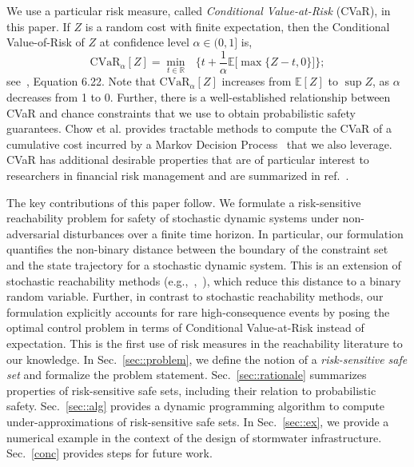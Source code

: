 \documentclass[letterpaper, 10 pt, conference]{ieeeconf}  %
\begin{document}
We use a particular risk measure, called \textit{Conditional Value-at-Risk} (CVaR), in this paper.
If $Z$ is a random cost with finite expectation, then the Conditional Value-of-Risk of $Z$ at confidence level $\alpha \in (0,1]$
is, 
\begin{equation}
\text{CVaR}_\alpha[Z] = {\underset{t \in \mathbb{R}}\min} \text{ }\Big\{ t + \frac{1}{\alpha}\mathbb{E}\big[\max\{Z-t,0\}\big] \Big\};
\label{cvareqn}
\end{equation}
see~\cite{shapiro2009lectures}, Equation 6.22.\footnotemark
{}
Note that $\text{CVaR}_\alpha[Z]$ increases from $\mathbb{E}[Z]$ to $\sup Z$, as $\alpha$ decreases from 1 to 0.\footnotemark
{}
Further, there is a well-established relationship between CVaR and chance constraints
that we use to obtain probabilistic safety guarantees. 
Chow et al. provides tractable methods to compute the CVaR of a cumulative cost
incurred by a Markov Decision Process~\cite{chow2015risk} that we also leverage.
CVaR has additional desirable properties that are of particular interest to researchers in financial risk management and are summarized in ref.~\cite{serraino2013conditional}. 

The key contributions of this paper follow.
We formulate a risk-sensitive reachability problem for safety of stochastic dynamic systems under non-adversarial disturbances
over a finite time horizon. In particular, our formulation quantifies the non-binary distance between the boundary of the constraint set and the
state trajectory for a stochastic dynamic system. This is an extension of stochastic 
reachability methods (e.g.,~\cite{abate2008probabilistic},~\cite{summers2010verification}), which reduce this distance to a binary random variable.
Further, in contrast to stochastic reachability methods, our formulation explicitly accounts for rare high-consequence events by posing the optimal control problem
in terms of Conditional Value-at-Risk instead of expectation. This is the first use of risk measures in the reachability literature to our knowledge.
In Sec.~\ref{sec::problem}, we define the notion of a \textit{risk-sensitive safe set} and formalize the problem statement.
Sec.~\ref{sec::rationale} summarizes properties of risk-sensitive safe sets, including their relation to probabilistic safety.
Sec.~\ref{sec::alg} provides a dynamic programming algorithm to compute under-approximations of risk-sensitive safe sets. %
In Sec.~\ref{sec::ex}, we provide a numerical example in the context of the design of stormwater infrastructure. Sec.~\ref{conc} provides steps for future work.
\end{document}
